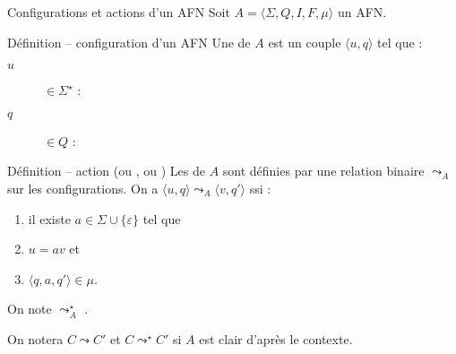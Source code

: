 
\begingroup


\begin{frame}{Configurations et actions d'un AFN}
  Soit $A=\langle \Sigma, Q, I, F, \mu \rangle$ un AFN. 
  
  \begin{block}{Définition -- configuration d'un AFN}
    Une  de $A$ est un couple \alert{$\langle u, q \rangle$} tel que :
    \begin{description}
    \item[\alert{$u$}] $\in \Sigma^\star$ : 
    \item[\alert{$q$}] $\in Q$ : 
    \end{description}
  \end{block}

  \begin{block}{Définition -- action (ou , ou )}
    Les   de $A$ sont définies par une
    relation binaire \alert{$\leadsto_A$} sur les configurations.
    On a \alert{$\langle u, q\rangle \leadsto_A \langle v, q'\rangle$} ssi :
    \begin{enumerate}
    \item il existe \alert{$a \in \Sigma\cup\{\varepsilon\}$} tel que
    \item \alert{$u=a v$} et
    \item \alert{$\langle q, a, q' \rangle \in \mu$}.
    \end{enumerate}
    On note \alert{$\leadsto_A^\star$} .
    
    \vspace{1mm}On notera \alert{$C \leadsto C'$} et \alert{$C \leadsto^\star C'$} si $A$ est clair d'après le contexte.
  \end{block}

  
\end{frame}

\endgroup
